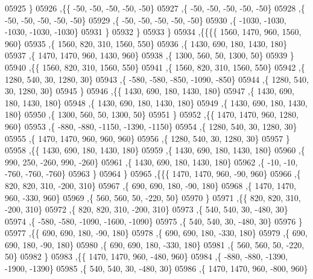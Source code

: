 \begin{DoxyCode}
05925     \}
05926    ,\{\{   -50,   -50,   -50,   -50,   -50\}
05927     ,\{   -50,   -50,   -50,   -50,   -50\}
05928     ,\{   -50,   -50,   -50,   -50,   -50\}
05929     ,\{   -50,   -50,   -50,   -50,   -50\}
05930     ,\{ -1030, -1030, -1030, -1030, -1030\}
05931     \}
05932    \}
05933   \}
05934  ,\{\{\{\{  1560,  1470,   960,  1560,   960\}
05935     ,\{  1560,   820,   310,  1560,   550\}
05936     ,\{  1430,   690,   180,  1430,   180\}
05937     ,\{  1470,  1470,   960,  1430,   960\}
05938     ,\{  1300,   560,    50,  1300,    50\}
05939     \}
05940    ,\{\{  1560,   820,   310,  1560,   550\}
05941     ,\{  1560,   820,   310,  1560,   550\}
05942     ,\{  1280,   540,    30,  1280,    30\}
05943     ,\{  -580,  -580,  -850, -1090,  -850\}
05944     ,\{  1280,   540,    30,  1280,    30\}
05945     \}
05946    ,\{\{  1430,   690,   180,  1430,   180\}
05947     ,\{  1430,   690,   180,  1430,   180\}
05948     ,\{  1430,   690,   180,  1430,   180\}
05949     ,\{  1430,   690,   180,  1430,   180\}
05950     ,\{  1300,   560,    50,  1300,    50\}
05951     \}
05952    ,\{\{  1470,  1470,   960,  1280,   960\}
05953     ,\{  -880,  -880, -1150, -1390, -1150\}
05954     ,\{  1280,   540,    30,  1280,    30\}
05955     ,\{  1470,  1470,   960,   960,   960\}
05956     ,\{  1280,   540,    30,  1280,    30\}
05957     \}
05958    ,\{\{  1430,   690,   180,  1430,   180\}
05959     ,\{  1430,   690,   180,  1430,   180\}
05960     ,\{   990,   250,  -260,   990,  -260\}
05961     ,\{  1430,   690,   180,  1430,   180\}
05962     ,\{   -10,   -10,  -760,  -760,  -760\}
05963     \}
05964    \}
05965   ,\{\{\{  1470,  1470,   960,   -90,   960\}
05966     ,\{   820,   820,   310,  -200,   310\}
05967     ,\{   690,   690,   180,   -90,   180\}
05968     ,\{  1470,  1470,   960,  -330,   960\}
05969     ,\{   560,   560,    50,  -220,    50\}
05970     \}
05971    ,\{\{   820,   820,   310,  -200,   310\}
05972     ,\{   820,   820,   310,  -200,   310\}
05973     ,\{   540,   540,    30,  -480,    30\}
05974     ,\{  -580,  -580, -1090, -1600, -1090\}
05975     ,\{   540,   540,    30,  -480,    30\}
05976     \}
05977    ,\{\{   690,   690,   180,   -90,   180\}
05978     ,\{   690,   690,   180,  -330,   180\}
05979     ,\{   690,   690,   180,   -90,   180\}
05980     ,\{   690,   690,   180,  -330,   180\}
05981     ,\{   560,   560,    50,  -220,    50\}
05982     \}
05983    ,\{\{  1470,  1470,   960,  -480,   960\}
05984     ,\{  -880,  -880, -1390, -1900, -1390\}
05985     ,\{   540,   540,    30,  -480,    30\}
05986     ,\{  1470,  1470,   960,  -800,   960\}

\end{DoxyCode}
